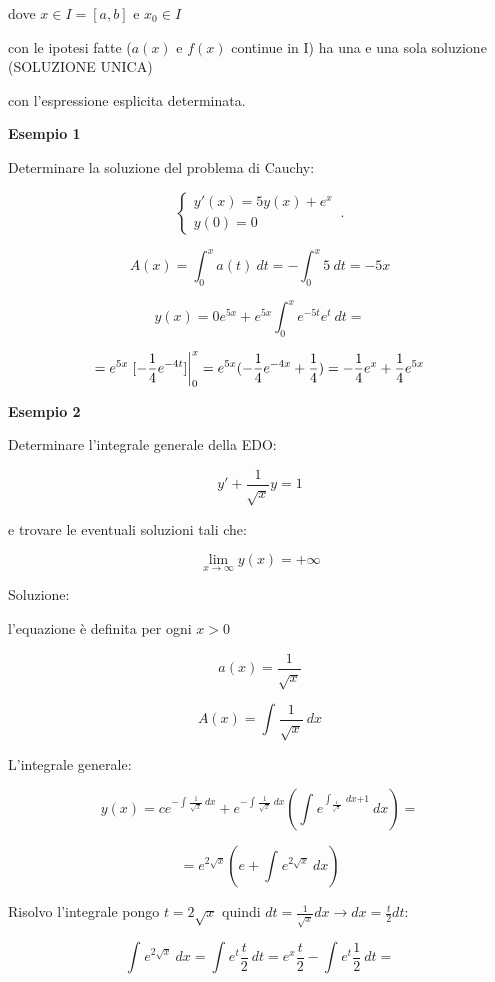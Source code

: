 \documentclass[11pt]{article}
\begin{document}
dove $x \in I = [a,b]$ e $x_0 \in I$

con le ipotesi fatte ($a(x)$ e $f(x)$ continue in I) ha una e una sola soluzione (SOLUZIONE UNICA)

con l'espressione esplicita determinata.

\textbf{Esempio 1}

Determinare la soluzione del problema di Cauchy:

\begin{equation}
    \begin{cases}
      y'(x)=5y(x) + e ^{x}\\
      y(0)=0
    \end{cases}\,.
\end{equation}

\[
    A(x)=\int_{{0}}^{{x}} {a(t)} \: d{t} {}= - \int_{{0}}^{{x}} {5} \: d{t} {}= -5x
\]

\[
    y(x)=0e ^{5x} + e ^{5x}\int_{{0}}^{{x}} {e ^{-5t}e ^{t}} \: d{t} {}=
\]

\[
    = e ^{5x} \left.[ -\frac{1}{4} e ^{-4t}]\right\rvert_{0}^{x} = e ^{5x}(-\frac{1}{4} e ^{-4x}+\frac{1}{4})= - \frac{1}{4} e ^{x}+ \frac{1}{4} e ^{5x}
\]

\textbf{Esempio 2}

Determinare l'integrale generale della EDO:

\[
    y'+\frac{1}{\sqrt{x}} y=1
\]

e trovare le eventuali soluzioni tali che:

\[
    \lim_{x \to \infty} y(x) = +\infty
\]

Soluzione: 

l'equazione è definita per ogni $x>0$

\[
    a(x) = \frac{1}{\sqrt{x}} 
\]

\[
    A(x) = \int_{{}}^{{}} {\frac{1}{\sqrt{x}} } \: d{x} {}
\]


L'integrale generale:

\[
    y(x) = c e ^{-\int_{{}}^{{}} {\frac{1}{\sqrt{x}} } \: d{x} {}}+ e ^{-\int_{{}}^{{}} {\frac{1}{\sqrt{x}} } \: d{x} {}}( \int_{{}}^{{}} {e ^{\int_{{\frac{1}{\sqrt{x}} }}^{{}} {} \: d{x} {+1}}} \: d{x} {})=
\]

\[
    =e ^{2 \sqrt{x}} (e+ \int_{{}}^{{}} {e ^{2\sqrt{x}}} \: d{x} {})
\]

Risolvo l'integrale pongo $t = 2 \sqrt{x}$ quindi $ dt = \frac{1}{\sqrt{x}}dx \rightarrow dx = \frac{t}{2} dt $:

\[
    \int_{{}}^{{}} {e ^{2 \sqrt{x}}} \: d{x} {}= \int_{{}}^{{}} {e ^{t}\frac{t}{2} } \: d{t} {} = e ^{x}\frac{t}{2} - \int_{{}}^{{}} {e ^{t}\frac{1}{2} } \: d{t} {}=
\]
\end{document}
